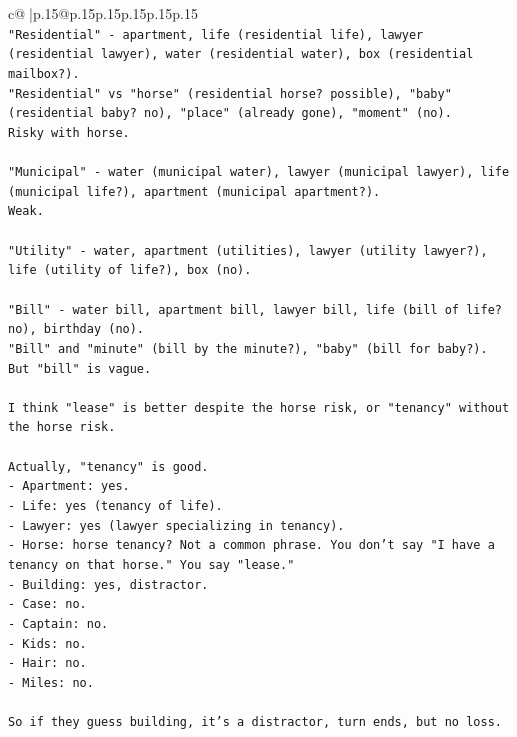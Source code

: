 \documentclass{article}
\begin{document}
{\begin{supertabular}{c@{$\;$}|p{.15\linewidth}@{}p{.15\linewidth}p{.15\linewidth}p{.15\linewidth}p{.15\linewidth}p{.15\linewidth}}
{{{\\ 
\texttt{"Residential" {-} apartment, life (residential life), lawyer (residential lawyer), water (residential water), box (residential mailbox?).} \\
\texttt{"Residential" vs "horse" (residential horse? possible), "baby" (residential baby? no), "place" (already gone), "moment" (no).} \\
\texttt{Risky with horse.} \\
\\ 
\texttt{"Municipal" {-} water (municipal water), lawyer (municipal lawyer), life (municipal life?), apartment (municipal apartment?).} \\
\texttt{Weak.} \\
\\ 
\texttt{"Utility" {-} water, apartment (utilities), lawyer (utility lawyer?), life (utility of life?), box (no).} \\
\\ 
\texttt{"Bill" {-} water bill, apartment bill, lawyer bill, life (bill of life? no), birthday (no).} \\
\texttt{"Bill" and "minute" (bill by the minute?), "baby" (bill for baby?).} \\
\texttt{But "bill" is vague.} \\
\\ 
\texttt{I think "lease" is better despite the horse risk, or "tenancy" without the horse risk.} \\
\\ 
\texttt{Actually, "tenancy" is good.} \\
\texttt{{-} Apartment: yes.} \\
\texttt{{-} Life: yes (tenancy of life).} \\
\texttt{{-} Lawyer: yes (lawyer specializing in tenancy).} \\
\texttt{{-} Horse: horse tenancy? Not a common phrase. You don't say "I have a tenancy on that horse." You say "lease."} \\
\texttt{{-} Building: yes, distractor.} \\
\texttt{{-} Case: no.} \\
\texttt{{-} Captain: no.} \\
\texttt{{-} Kids: no.} \\
\texttt{{-} Hair: no.} \\
\texttt{{-} Miles: no.} \\
\\ 
\texttt{So if they guess building, it's a distractor, turn ends, but no loss.} \\
}}}
\end{supertabular}}
\end{document}
